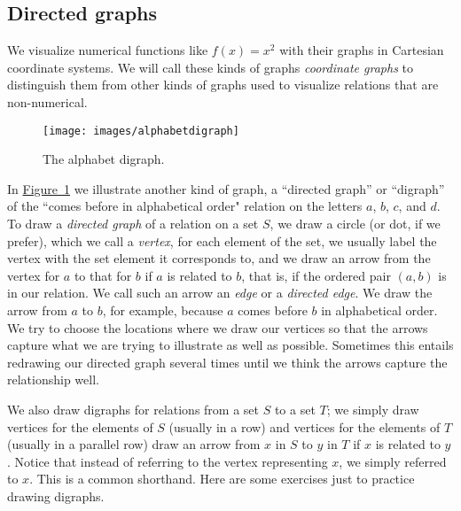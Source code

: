\documentclass[10pt,]{book}
\theoremstyle{plain}
\theoremstyle{definition}
\theoremstyle{definition}
\numberwithin{equation}{chapter}
\begin{document}
\subsection[{Directed graphs}]{Directed graphs}\label{relationdigraph}
We visualize numerical functions like \(f(x)=x^2\) with their graphs in Cartesian coordinate systems. We will call these kinds of graphs \emph{coordinate graphs} to distinguish them from other kinds of graphs used to visualize relations that are non-numerical.%
\begin{figure}
\centering
\texttt{[image: images/alphabetdigraph]}
\caption{The alphabet digraph.\label{alphabetdigraph}}
\end{figure}
In \hyperref[alphabetdigraph]{Figure~\ref{alphabetdigraph}} we illustrate another kind of graph, a ``directed graph'' or ``digraph'' of the ``comes before in alphabetical order" relation on the letters \(a\), \(b\), \(c\), and \(d\). To draw a \emph{directed graph} of a relation on a set \(S\), we draw a circle (or dot, if we prefer), which we call a \emph{vertex}, for each element of the set, we usually label the vertex with the set element it corresponds to, and we draw an arrow from the vertex for \(a\) to that for \(b\) if \(a\) is related to \(b\), that is, if the ordered pair \((a,b)\) is in our relation. We call such an arrow an \emph{edge} or a \emph{directed edge}. We draw the arrow from \(a\) to \(b\), for example, because \(a\) comes before \(b\) in alphabetical order. We try to choose the locations where we draw our vertices so that the arrows capture what we are trying to illustrate as well as possible. Sometimes this entails redrawing our directed graph several times until we think the arrows capture the relationship well.%
\par
We also draw digraphs for relations from a set \(S\) to a set \(T\); we simply draw vertices for the elements of \(S\) (usually in a row) and vertices for the elements of \(T\) (usually in a parallel row) draw an arrow from \(x\) in \(S\) to \(y\) in \(T\) if \(x\) is related to \(y\). Notice that instead of referring to the vertex representing \(x\), we simply referred to \(x\). This is a common shorthand. Here are some exercises just to practice drawing digraphs.%
\end{document}

